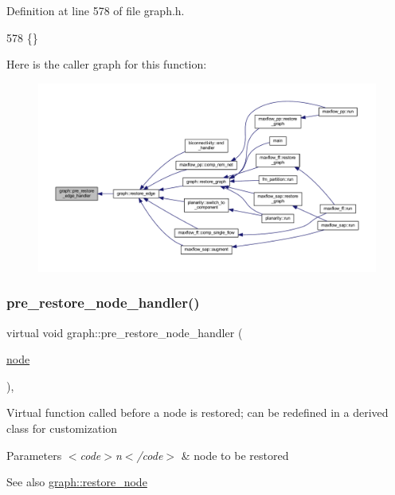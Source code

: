 Definition at line 578 of file graph.\+h.


\begin{DoxyCode}
578 \{\}       
\end{DoxyCode}
Here is the caller graph for this function\+:
\nopagebreak
\begin{figure}[H]
\begin{center}
\leavevmode
\includegraphics[width=350pt]{classgraph_a569d227d9f4914278a143d52139e3303_icgraph}
\end{center}
\end{figure}
\mbox{\label{classgraph_a3a305d240ab5237a2adae315b50105a6}} 
\subsubsection{\texorpdfstring{pre\+\_\+restore\+\_\+node\+\_\+handler()}{pre\_restore\_node\_handler()}}
{\footnotesize\ttfamily virtual void graph\+::pre\+\_\+restore\+\_\+node\+\_\+handler (\begin{DoxyParamCaption}\item[{\mbox{\hyperlink{classnode}{node}}}]{ }\end{DoxyParamCaption})\hspace{0.3cm}{\ttfamily [inline]}, {\ttfamily [virtual]}}

Virtual function called before a node is restored; can be redefined in a derived class for customization


\begin{DoxyParams}{Parameters}
{\em $<$code$>$n$<$/code$>$} & node to be restored \\
\hline
\end{DoxyParams}
\begin{DoxySeeAlso}{See also}
\mbox{\hyperlink{classgraph_ab57aab79e649cc275052b7decbdd03ec}{graph\+::restore\+\_\+node}} 
\end{DoxySeeAlso}


